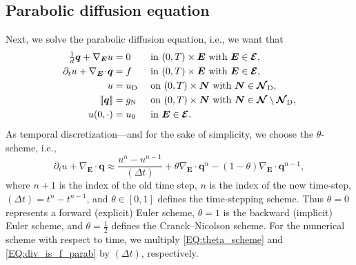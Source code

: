 \documentclass[a4paper, english, 12pt, reqno, draft]{amsart}
\theoremstyle{definition}
\theoremstyle{remark}
\numberwithin{equation}{section}
\newcommand{\SetEdge}{\ensuremath{\boldsymbol{\mathcal E}}}
\newcommand{\SetNode}{\ensuremath{\boldsymbol{\mathcal N}}}
\newcommand{\SetNodeDir}{\ensuremath{\SetNode_\textup D}}
\newcommand{\Edge}{{\ensuremath{\boldsymbol E}}}
\newcommand{\Node}{{\ensuremath{\boldsymbol N}}}
\newcommand{\Nabla}{\ensuremath{\nabla_\Edge}}
\newcommand{\Div}{\ensuremath{\Nabla\!\cdot\!}}
\newcommand{\jump}[1]{{[\![ #1 ]\!]}}
\renewcommand{\vec}[1]{\ensuremath{\boldsymbol{#1}}}
\newcommand{\deltat}{\ensuremath{(\Delta t)}}
\begin{document}
\subsection{Parabolic diffusion equation}
% 
Next, we solve the parabolic diffusion equation, i.e., we want that
% 
\begin{subequations}\label{EQ:diffusion_parab}
\begin{align}
 \tfrac{1}{d} \vec q + \Nabla u & = 0 && \text{ in } (0,T) \times \Edge \text{ with } \Edge \in \SetEdge,\label{EQ:primal_dual_parab}\\
 \partial_t u + \Div \vec q & = f && \text{ in } (0,T) \times \Edge \text{ with } \Edge \in \SetEdge,\label{EQ:div_is_f_parab}\\
 u & = u_\textup D && \text{ on } (0,T) \times \Node \text{ with } \Node \in \SetNodeDir,\label{EQ:dir_cond_parab}\\
 \jump{\vec q} & = g_\textup N && \text{ on } (0,T) \times \Node \text{ with } \Node \in \SetNode \setminus \SetNodeDir,\label{EQ:neu_cond_parab}\\
 u(0,\cdot) & = u_0 && \text{ in } \Edge \in \SetEdge.\label{EQ:initial_parab}
\end{align}
\end{subequations}
% 
As temporal discretization---and for the sake of simplicity, we choose the $\theta$-scheme, i.e.,
% 
\begin{equation}\label{EQ:theta_scheme}
 \partial_t u + \Div \vec q \approx \frac{ u^n - u^{n-1} }{\deltat} + \theta \Div \vec q^n - (1 - \theta) \Div \vec q^{n-1},
\end{equation}
%
where $n+1$ is the index of the old time step, $n$ is the index of the new time-step, $\deltat = t^n - t^{n-1}$, and $\theta \in [0,1]$ defines the time-stepping scheme. Thus $\theta = 0$ represents a forward (explicit) Euler scheme, $\theta = 1$ is the backward (implicit) Euler scheme, and $\theta = \tfrac{1}{2}$ defines the Cranck--Nicolson scheme. For the numerical scheme with respect to time, we multiply \eqref{EQ:theta_scheme} and \eqref{EQ:div_is_f_parab} by $\deltat$, respectively.
\end{document}
